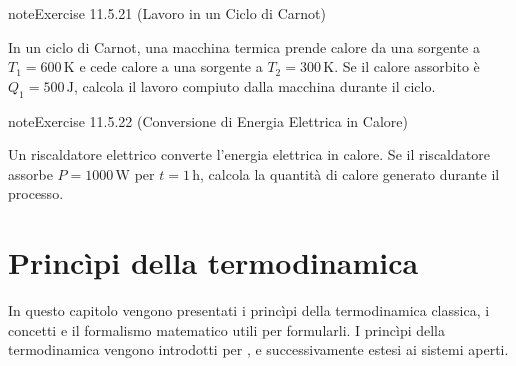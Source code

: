 \documentclass[letterpaper,10pt,italian]{jupyterBook}
\begin{document}
\begin{sphinxadmonition}{note}{Exercise 11.5.21 (Lavoro in un Ciclo di Carnot)}



\sphinxAtStartPar
In un ciclo di Carnot, una macchina termica prende calore da una sorgente a \(T_1 = 600 \, \text{K}\) e cede calore a una sorgente a \(T_2 = 300 \, \text{K}\). Se il calore assorbito è \(Q_1 = 500 \, \text{J}\), calcola il lavoro compiuto dalla macchina durante il ciclo.
\end{sphinxadmonition}
 \label{exercise:ch/thermodynamics/foundation-problems-exercise-21}

\begin{sphinxadmonition}{note}{Exercise 11.5.22 (Conversione di Energia Elettrica in Calore)}



\sphinxAtStartPar
Un riscaldatore elettrico converte l’energia elettrica in calore. Se il riscaldatore assorbe \(P = 1000 \, \text{W}\) per \(t = 1 \, \text{h}\), calcola la quantità di calore generato durante il processo.
\end{sphinxadmonition}

\sphinxstepscope


\chapter{Princìpi della termodinamica}
\label{\detokenize{ch/thermodynamics/principles:principi-della-termodinamica}}\label{\detokenize{ch/thermodynamics/principles:physics-hs-thermodynamics-principles}}\label{\detokenize{ch/thermodynamics/principles::doc}}
\sphinxAtStartPar
In questo capitolo vengono presentati i princìpi della termodinamica classica, i concetti e il formalismo matematico utili per formularli.
I princìpi della termodinamica vengono introdotti per , e successivamente estesi ai sistemi aperti.
\end{document}

